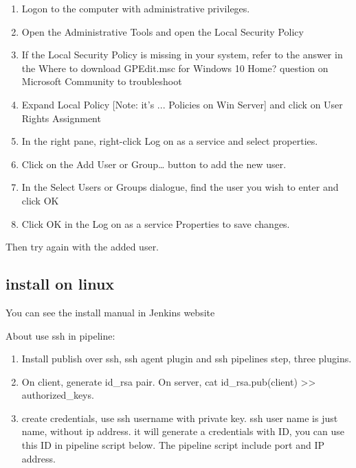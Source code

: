\documentclass[paper=8.5in:11in, twoside, 12pt, pagesize=pdftex]{book}
\begin{document}
\begin{enumerate}
	\item Logon to the computer with administrative privileges.
	
	\item Open the Administrative Tools and open the Local Security Policy
	
	\item If the Local Security Policy is missing in your system, refer to the answer in the Where to download GPEdit.msc for Windows 10 Home? question on Microsoft Community to troubleshoot
	
	\item Expand Local Policy [Note: it's ... Policies on Win Server] and click on User Rights Assignment
	
	\item In the right pane, right-click Log on as a service and select properties.
	\item Click on the Add User or Group… button to add the new user.
	
	\item In the Select Users or Groups dialogue, find the user you wish to enter and click OK
	
	\item Click OK in the Log on as a service Properties to save changes.
\end{enumerate}
Then try again with the added user.

\subsection{install on linux}
You can see the install manual in Jenkins website


About use ssh in pipeline:
\begin{enumerate}
	\item Install publish over ssh, ssh agent plugin and ssh pipelines step, three plugins.
	
	
	\item On client, generate id\_rsa pair. On server, cat id\_rsa.pub(client) >> authorized\_keys. 
	 
	\item create credentials, use ssh username with private key. ssh user name is just name, without ip address. it will generate a credentials with ID, you can use this ID in pipeline script below. The pipeline script include port and IP address.   
\end{enumerate}
\end{document}
